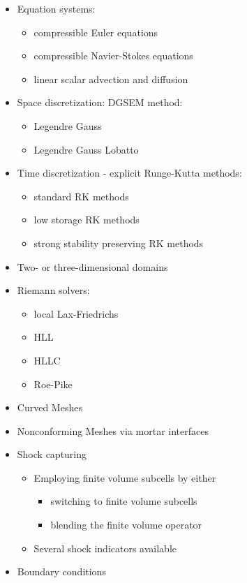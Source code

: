 \begin{itemize}
 \item Equation systems:
   \begin{itemize}
      \item compressible Euler equations
      \item compressible Navier-Stokes equations
      \item linear scalar advection and diffusion
    \end{itemize}
  \item Space discretization: DGSEM method:
   \begin{itemize}
     \item Legendre Gauss
     \item Legendre Gauss Lobatto
    \end{itemize}
  \item Time discretization - explicit Runge-Kutta methods:
  \begin{itemize}
     \item standard RK methods
     \item low storage RK methods
     \item strong stability preserving RK methods
    \end{itemize}
  \item Two- or three-dimensional domains
  \item Riemann solvers:
  \begin{itemize}
   \item local Lax-Friedrichs
   \item HLL
   \item HLLC
   \item Roe-Pike
   \end{itemize}
  \item Curved Meshes
  \item Nonconforming Meshes via mortar interfaces
  \item Shock capturing
  \begin{itemize}
   \item  Employing finite volume subcells by either
   \begin{itemize}
    \item switching to finite volume subcells
    \item blending the finite volume operator
    \end{itemize}
   \item Several shock indicators available
   \end{itemize}
 \item Boundary conditions

\end{itemize}
